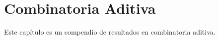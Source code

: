 \chapter{Combinatoria Aditiva}
Este capítulo es un compendio de resultados en combinatoria aditiva.


%
%

